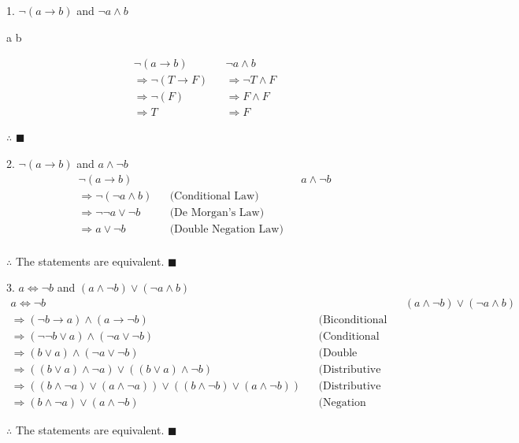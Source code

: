\documentclass[]{article}
\begin{document}
1. $\neg(a \rightarrow b)$ and $\neg a \land b$

\begin{center}
 a  b 
\end{center}
\begin{align*}
    \neg(a \rightarrow b) && \neg a \land b \\
    \Rightarrow \neg(T \rightarrow F) && \Rightarrow \neg T \land F \\
    \Rightarrow \neg(F) && \Rightarrow F \land F \\
    \Rightarrow T && \Rightarrow F
\end{align*}
\begin{center}
    $\therefore$  $\blacksquare$
\end{center}

2. $\neg(a \rightarrow b)$ and $a \land \neg b$
\begin{align*}
    \neg(a \rightarrow b) &&&& \boxed{a \land \neg b} \\
    \Rightarrow \neg(\neg a \land b) && \text{(Conditional Law)}  \\
    \Rightarrow \neg\neg a \lor \neg b && \text{(De Morgan's Law)} \\
    \Rightarrow \boxed{a \lor \neg b} &&\text{(Double Negation Law)} \\
\end{align*}
\begin{center}
    $\therefore$ The statements are equivalent. $\blacksquare$
\end{center}

3. $a \iff \neg b$ and $(a \land \neg b) \lor (\neg a \land b)$
\begin{align*}
    a \iff \neg b &&&& \boxed{(a \land \neg b) \lor (\neg a \land b)} \\
    \Rightarrow (\neg b \rightarrow a) \land (a \rightarrow \neg b) && \text{(Biconditional Law)} \\
    \Rightarrow (\neg\neg b \lor a) \land (\neg a \lor \neg b)   && \text{(Conditional Law)} \\
    \Rightarrow (b \lor a) \land (\neg a \lor \neg b) && \text{(Double Negation Law)} \\
    \Rightarrow ((b \lor a) \land \neg a) \lor ((b \lor a) \land \neg b) && \text{(Distributive Law)} \\
    \Rightarrow ((b \land \neg a) \lor (a \land \neg a)) \lor ((b \land \neg b) \lor (a \land \neg b)) && \text{(Distributive Law)} \\
    \Rightarrow \boxed{(b \land \neg a) \lor (a \land \neg b)} && \text{(Negation Law)}
\end{align*}
\begin{center}
    $\therefore$ The statements are equivalent. $\blacksquare$
\end{center}
\end{document}
